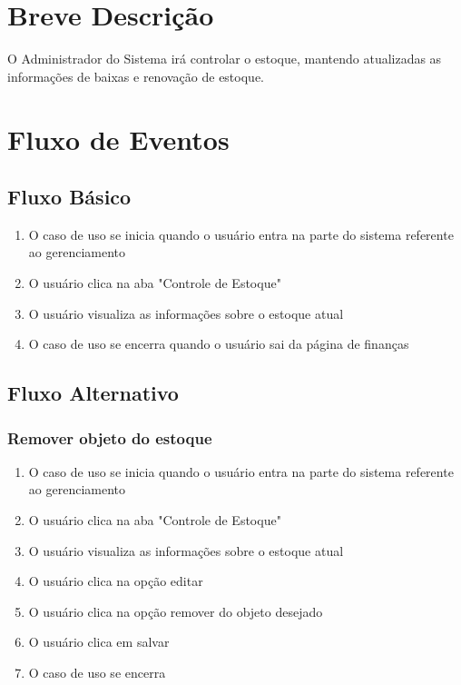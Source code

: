 \section{Breve Descrição}

O Administrador do Sistema irá controlar o estoque, mantendo atualizadas as informações de baixas e renovação de estoque.


\section{Fluxo de Eventos}
\subsection{Fluxo Básico}

\begin{enumerate}
	\item O caso de uso se inicia quando o usuário entra na parte do sistema referente ao gerenciamento
	\item O usuário clica na aba "Controle de Estoque"
	\item O usuário visualiza as informações sobre o estoque atual
	\item O caso de uso se encerra quando o usuário sai da página de finanças
\end{enumerate}

\subsection{Fluxo Alternativo}
\subsubsection{Remover objeto do estoque}
\begin{enumerate}
	\item O caso de uso se inicia quando o usuário entra na parte do sistema referente ao gerenciamento
	\item O usuário clica na aba "Controle de Estoque"
	\item O usuário visualiza as informações sobre o estoque atual
	\item O usuário clica na opção editar
	\item O usuário clica na opção remover do objeto desejado
	\item O usuário clica em salvar
	\item O caso de uso se encerra
\end{enumerate}


